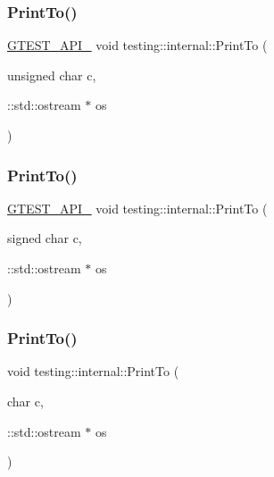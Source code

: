 \mbox{\label{namespacetesting_1_1internal_aa7e70a85d66f0c109e3e69629ef577f2}} 
\subsubsection{\texorpdfstring{Print\+To()}{PrintTo()}\hspace{0.1cm}{\footnotesize\ttfamily [2/19]}}
{\footnotesize\ttfamily \hyperlink{gtest-port_8h_aa73be6f0ba4a7456180a94904ce17790}{G\+T\+E\+S\+T\+\_\+\+A\+P\+I\+\_\+} void testing\+::internal\+::\+Print\+To (\begin{DoxyParamCaption}\item[{unsigned char}]{c,  }\item[{\+::std\+::ostream $\ast$}]{os }\end{DoxyParamCaption})}

\mbox{\label{namespacetesting_1_1internal_abf6c518b437569187c1218166c702807}} 
\subsubsection{\texorpdfstring{Print\+To()}{PrintTo()}\hspace{0.1cm}{\footnotesize\ttfamily [3/19]}}
{\footnotesize\ttfamily \hyperlink{gtest-port_8h_aa73be6f0ba4a7456180a94904ce17790}{G\+T\+E\+S\+T\+\_\+\+A\+P\+I\+\_\+} void testing\+::internal\+::\+Print\+To (\begin{DoxyParamCaption}\item[{signed char}]{c,  }\item[{\+::std\+::ostream $\ast$}]{os }\end{DoxyParamCaption})}

\mbox{\label{namespacetesting_1_1internal_a476bd3d411d4f129620aaf8999c257c0}} 
\subsubsection{\texorpdfstring{Print\+To()}{PrintTo()}\hspace{0.1cm}{\footnotesize\ttfamily [4/19]}}
{\footnotesize\ttfamily void testing\+::internal\+::\+Print\+To (\begin{DoxyParamCaption}\item[{char}]{c,  }\item[{\+::std\+::ostream $\ast$}]{os }\end{DoxyParamCaption})\hspace{0.3cm}{\ttfamily [inline]}}

